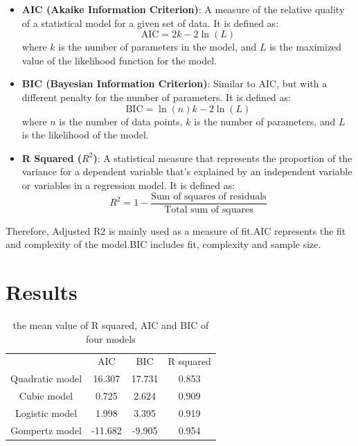 \documentclass[11pt]{article}
\begin{document}
\begin{itemize}
    \item \textbf{AIC (Akaike Information Criterion)}: 
    A measure of the relative quality of a statistical model for a given set of data. It is defined as:
    \begin{equation}
        \text{AIC} = 2k - 2\ln(L)
    \end{equation}
    where $k$ is the number of parameters in the model, and $L$ is the maximized value of the likelihood function for the model.
    
    \item \textbf{BIC (Bayesian Information Criterion)}: 
    Similar to AIC, but with a different penalty for the number of parameters. It is defined as:
    \begin{equation}
        \text{BIC} = \ln(n)k - 2\ln(L)
    \end{equation}
    where $n$ is the number of data points, $k$ is the number of parameters, and $L$ is the likelihood of the model.
    
    \item \textbf{R Squared ($R^2$)}: 
    A statistical measure that represents the proportion of the variance for a dependent variable that's explained by an independent variable or variables in a regression model. It is defined as:
    \begin{equation}
        R^2 = 1 - \frac{\text{Sum of squares of residuals}}{\text{Total sum of squares}}
    \end{equation}
\end{itemize}

Therefore, Adjusted R2 is mainly used as a measure of fit.AIC represents the fit and complexity of the model.BIC includes fit, complexity and sample size.

\section{Results}
\begin{table}
    \centering
    \begin{tabular}{cccc}
         &  AIC&  BIC& R squared\\
         Quadratic model&  16.307&  17.731& 0.853\\
         Cubic model&  0.725&  2.624& 0.909\\
         Logistic model&  1.998&  3.395& 0.919\\
         Gompertz model&  -11.682&  -9.905& 0.954\\
    \end{tabular}
    \caption{the mean value of R squared, AIC and BIC of four models}
    \label{tab:my_label}
\end{table}
\end{document}

